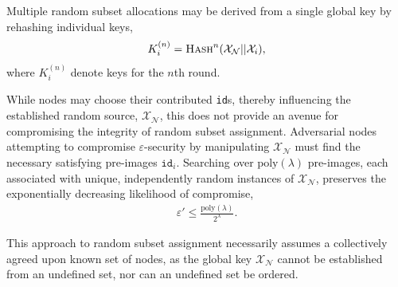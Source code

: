 Multiple random subset allocations may be derived from a single global key by rehashing individual keys,
\begin{align}
	K_i^{(n)} = \textsc{Hash}^n(\mathcal{X}_\mathcal{N} || \mathcal{X}_i),
\end{align}
where $K_i^{(n)}$ denote keys for the $n$th round.

While nodes may choose their contributed \texttt{id}s, thereby influencing the established random source, $\mathcal{X}_\mathcal{N}$, this does not provide an avenue for compromising the integrity of random subset assignment. Adversarial nodes attempting to compromise $\varepsilon$-security by manipulating $\mathcal{X}_\mathcal{N}$ must find the necessary satisfying pre-images $\mathtt{id}_i$. Searching over $\mathrm{poly}(\lambda)$ pre-images, each associated with unique, independently random instances of $\mathcal{X}_\mathcal{N}$, preserves the exponentially decreasing likelihood of compromise,
\begin{align}
	\varepsilon' \leq \frac{\mathrm{poly}(\lambda)}{2^\lambda}.
\end{align}

This approach to random subset assignment necessarily assumes a collectively agreed upon known set of nodes, as the global key $\mathcal{X}_\mathcal{N}$ cannot be established from an undefined set, nor can an undefined set be ordered.

%
%
%



